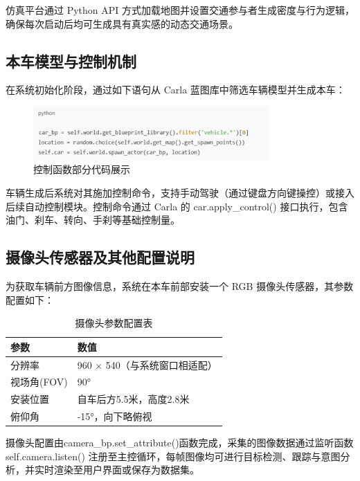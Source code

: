 仿真平台通过 Python API 方式加载地图并设置交通参与者生成密度与行为逻辑，确保每次启动后均可生成具有真实感的动态交通场景。

\subsection{本车模型与控制机制}

在系统初始化阶段，通过如下语句从 Carla 蓝图库中筛选车辆模型并生成本车：

\begin{figure}[H]
	\centering
	\includegraphics[width=0.8\textwidth]{images/图6 控制函数部分代码展示.pdf}  %
	\caption{控制函数部分代码展示}
	\label{fig:example_image}  %
\end{figure}

车辆生成后系统对其施加控制命令，支持手动驾驶（通过键盘方向键操控）或接入后续自动控制模块。控制命令通过 Carla 的 car.apply\_control() 接口执行，包含油门、刹车、转向、手刹等基础控制量。

\subsection{摄像头传感器及其他配置说明}

为获取车辆前方图像信息，系统在本车前部安装一个 RGB 摄像头传感器，其参数配置如下：

\begin{table}[H]
	\caption{摄像头参数配置表}
	\label{tab:camera_params}
	\centering
	\begin{tabular}{ll}
		\toprule
		参数 & 数值 \\
		\midrule
		分辨率 & 960 × 540（与系统窗口相适配） \\
		视场角(FOV) & 90° \\
		安装位置 & 自车后方5.5米，高度2.8米 \\
		俯仰角 & -15°，向下略俯视 \\
		\bottomrule
	\end{tabular}
\end{table}

摄像头配置由camera\_bp.set\_attribute()函数完成，采集的图像数据通过监听函数 self.camera.listen() 注册至主控循环，每帧图像均可进行目标检测、跟踪与意图分析，并实时渲染至用户界面或保存为数据集。

